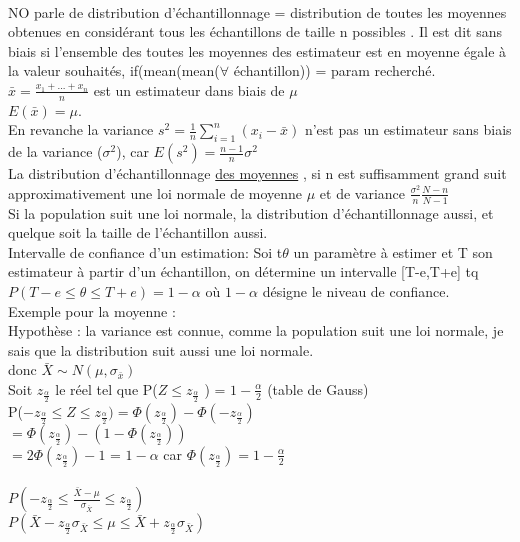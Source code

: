 \documentclass{article}
\begin{document}
\paragraph{} NO parle de distribution d'échantillonnage =  distribution de toutes les moyennes obtenues en considérant tous les échantillons de taille n possibles .  Il est dit sans biais si l'ensemble des toutes les moyennes des estimateur est en moyenne égale à la valeur souhaités, if(mean(mean($\forall$ échantillon)) = param recherché.\\
$\bar{x} = \frac{x_1+...+x_n}{n}$ est un estimateur dans biais de $\mu$ \\$E(\bar{x})= \mu$.\\
En revanche la variance $s^2 = \frac{1}{n} \sum_{i=1}^n (x_i -  \bar{x})$ n'est pas un estimateur sans biais de la variance ($\sigma^2$), car $E(s^2) = \frac{n-1}{n} \sigma^2$\\La distribution d'échantillonnage \underline{des moyennes} , si n est suffisamment grand suit approximativement une loi normale de moyenne $\mu$ et de variance $\frac{\sigma^2}{n} \frac{N-n}{N-1}$\\Si la population suit une loi normale, la distribution d'échantillonnage aussi, et quelque soit la taille de l'échantillon aussi.\\ Intervalle de confiance d'un estimation: Soi t$\theta$ un paramètre à estimer et T son estimateur à partir d'un échantillon, on détermine un intervalle [T-e,T+e] tq $P(T-e\leq \theta \leq T+e) = 1-\alpha$ où $1-\alpha$ désigne le niveau de confiance.\\
Exemple pour la moyenne : \\Hypothèse : la variance est connue, comme la population suit une loi normale, je sais que la distribution suit aussi une loi normale. \\ donc $\bar{X} \sim N(\mu,\sigma_{\bar{x}})$\\Soit $z_\frac{\alpha}{2}$ le réel tel que P($Z\leq z_{\frac{\alpha}{2}}$ ) = $1-\frac{ \alpha}{2}$ (table de Gauss)\\
P($- z_{\frac{\alpha}{2}} \leq Z \leq z_{\frac{\alpha}{2}}) = \Phi(z_{\frac{\alpha}{2}}) - \Phi(-z_{\frac{\alpha}{2}})$\\$=\Phi(z_{\frac{\alpha}{2}}) -(1- \Phi(z_{\frac{\alpha}{2}}))$\\$=2\Phi(z_{\frac{\alpha}{2}})-1$ = $1-\alpha$ car $ \Phi(z_{\frac{\alpha}{2}}) = 1-\frac{\alpha}{2}$\\\\
$P(- z_{\frac{\alpha}{2}} \leq \frac{\bar{X}-\mu}{\sigma_{\bar{X}}} \leq z_{\frac{\alpha}{2}})$\\
$P(\bar{X}- z_{\frac{\alpha}{2}}\sigma_{\bar{X}} \leq \mu \leq \bar{X}+z_{\frac{\alpha}{2}}\sigma_{\bar{X}})$
\end{document}
